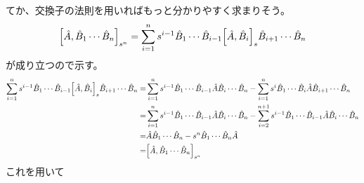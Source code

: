 \documentclass{ltjsarticle}
\begin{document}
てか、交換子の法則を用いればもっと分かりやすく求まりそう。
\begin{align}
  \comm{\hat{A}}{\hat{B}_1\cdots\hat{B}_n}_{s^n}=\sum_{i=1}^{n}s^{i-1}\hat{B}_1\cdots\hat{B}_{i-1}\comm{\hat{A}}{\hat{B}_i}_s\hat{B}_{i+1}\cdots\hat{B}_n
\end{align}
が成り立つので示す。
\begin{align}
  \sum_{i=1}^{n}s^{i-1}\hat{B}_1\cdots\hat{B}_{i-1}\comm{\hat{A}}{\hat{B}_i}_s\hat{B}_{i+1}\cdots\hat{B}_n
  =&\sum_{i=1}^{n}s^{i-1}\hat{B}_1\cdots\hat{B}_{i-1}\hat{A}\hat{B}_i\cdots\hat{B}_n-\sum_{i=1}^{n}s^{i}\hat{B}_1\cdots\hat{B}_i\hat{A}\hat{B}_{i+1}\cdots\hat{B}_n\\
  =&\sum_{i=1}^{n}s^{i-1}\hat{B}_1\cdots\hat{B}_{i-1}\hat{A}\hat{B}_i\cdots\hat{B}_n-\sum_{i=2}^{n+1}s^{i-1}\hat{B}_1\cdots\hat{B}_{i-1}\hat{A}\hat{B}_{i}\cdots\hat{B}_n\\
  =&\hat{A}\hat{B}_1\cdots\hat{B}_n-s^n\hat{B}_1\cdots\hat{B}_n\hat{A}\\
  =&\comm{\hat{A}}{\hat{B}_1\cdots\hat{B}_n}_{s^n}
\end{align}
これを用いて
\end{document}
